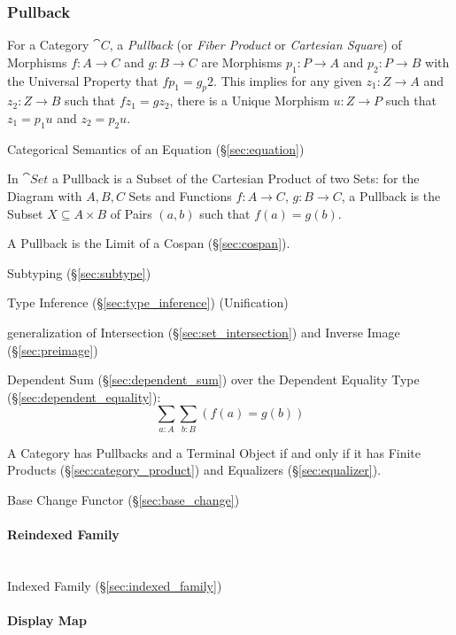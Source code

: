 \subsubsection{Pullback}\label{sec:pullback}

For a Category $\cat{C}$, a \emph{Pullback} (or \emph{Fiber
  Product} or \emph{Cartesian Square}) of Morphisms $f : A \rightarrow
C$ and $g : B \rightarrow C$ are Morphisms $p_1 : P \rightarrow A$ and
$p_2 : P \rightarrow B$ with the Universal Property that $fp_1 =
g_p2$. This implies for any given $z_1 : Z \rightarrow A$ and $z_2 : Z
\rightarrow B$ such that $fz_1 = gz_2$, there is a Unique Morphism $u
: Z \rightarrow P$ such that $z_1 = p_1 u$ and $z_2 = p_2 u$.

Categorical Semantics of an Equation (\S\ref{sec:equation})

In $\cat{Set}$ a Pullback is a Subset of the Cartesian Product of two
Sets: for the Diagram with $A,B,C$ Sets and Functions $f : A
\rightarrow C$, $g : B \rightarrow C$, a Pullback is the Subset $X
\subseteq A \times B$ of Pairs $(a,b)$ such that $f(a) = g(b)$.

A Pullback is the Limit of a Cospan (\S\ref{sec:cospan}).

Subtyping (\S\ref{sec:subtype})

Type Inference (\S\ref{sec:type_inference}) (Unification)

generalization of Intersection (\S\ref{sec:set_intersection}) and
Inverse Image (\S\ref{sec:preimage})

Dependent Sum (\S\ref{sec:dependent_sum}) over the Dependent Equality
Type (\S\ref{sec:dependent_equality}):
\[
  \sum_{a:A} \sum_{b:B} (f(a) = g(b))
\]

A Category has Pullbacks and a Terminal Object if and only if it has
Finite Products (\S\ref{sec:category_product}) and Equalizers
(\S\ref{sec:equalizer}). \cite{awodey06}

Base Change Functor (\S\ref{sec:base_change})



\paragraph{Reindexed Family}\label{sec:reindexed_family}
\hfill \\

Indexed Family (\S\ref{sec:indexed_family})



\paragraph{Display Map}\label{sec:display_map}
\hfill \\

